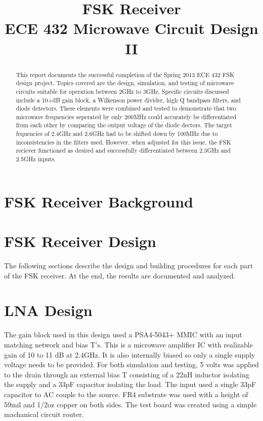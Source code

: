 \documentclass[conference]{IEEEtran}
\begin{document}
\title{FSK Receiver\\ECE 432 Microwave Circuit Design II}
\author{
}
\maketitle
\IEEEpeerreviewmaketitle
\begin{abstract}
This report documents the successful completion of the Spring 2013 ECE 432 FSK design project. Topics covered are the design, simulation, and testing of microwave circuits suitable for operation between 2GHz to 3GHz. Specific circuits discussed include a 10+dB gain block, a Wilkenson power divider, high Q bandpass filters, and diode detectors. These elements were combined and tested to demonstrate that two microwave frequencies seperated by only 200MHz could accurately be differentiated from each other by comparing the output voltage of the diode dectors. The target fequencies of 2.4GHz and 2.6GHz had to be shifted down by 100MHz due to inconsistencies in the filters used. However, when adjusted for this issue, the FSK reciever functioned as desired and successfully differentiated between 2.3GHz and 2.5GHz inputs.
\end{abstract}
\section{FSK Receiver Background}

\section{FSK Receiver Design}
The following sections describe the design and building procedures for each part of the FSK receiver.  At the end, the results are documented and analyzed.


\section{LNA Design}
The gain block used in this design used a PSA4-5043+ MMIC with an input matching network and bias T's. This is a microwave amplifier IC with realizable gain of 10 to 11 dB at 2.4GHz. It is also internally biased so only a single supply voltage needs to be provided. For both simulation and testing, 5 volts was applied to the drain through an external bias T consisting of a 22nH inductor isolating the supply and a 33pF capacitor isolating the load. The input used a single 33pF capacitor to AC couple to the source. FR4 substrate was used with a height of 59mil and 1/2oz copper on both sides. The test board was created using a simple machanical circuit router. 
\end{document}
